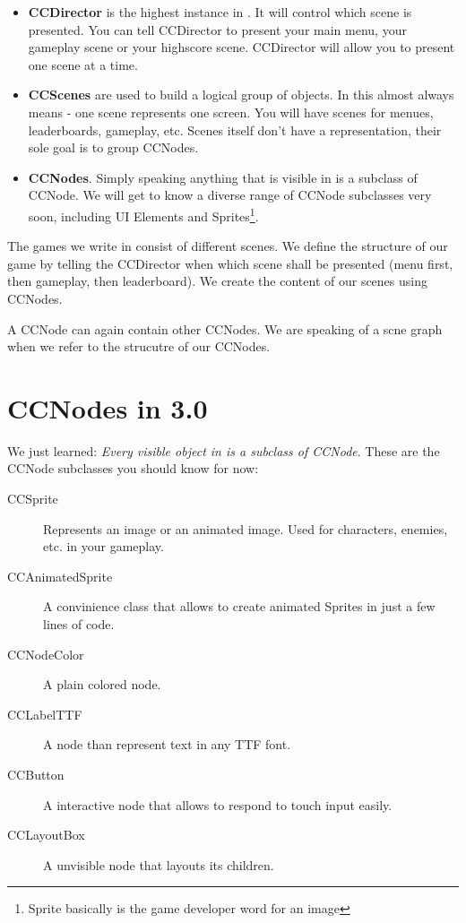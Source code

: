 \begin{itemize}
  \item \textbf{CCDirector} is the highest instance in \cocos{}. It will control
  which scene is presented. You can tell CCDirector to present your main menu,
  your gameplay scene or your highscore scene. CCDirector will allow you to
  present one scene at a time.
  \item \textbf{CCScenes} are used to build a logical group of objects. In
  \cocos{} this almost always means - one scene represents one screen. You will
  have scenes for menues, leaderboards, gameplay, etc. Scenes itself don't have
  a representation, their sole goal is to group CCNodes.
  \item \textbf{CCNodes}. Simply speaking anything that is visible in \cocos{}
  is a subclass of CCNode. We will get to know a diverse range of CCNode
  subclasses very soon, including UI Elements and Sprites\footnote{Sprite
  basically is the game developer word for an image}.
\end{itemize}

The games we write in \cocos{} consist of different scenes. We define the
structure of our game by telling the CCDirector when which scene shall be
presented (menu first, then gameplay, then leaderboard). We create the content
of our scenes using CCNodes.

A CCNode can again contain other CCNodes. We are speaking of a scne graph when
we refer to the strucutre of our CCNodes.

\section{CCNodes in \cocos{} 3.0}
We just learned: \textit{Every visible object in \cocos{} is a subclass of
CCNode}. These are the CCNode subclasses you should know for now:

\begin{description}
  \item[CCSprite] Represents an image or an animated image. Used for characters,
  enemies, etc. in your gameplay.
  \item[CCAnimatedSprite] A convinience class that allows to create animated
  Sprites in just a few lines of code.
  \item[CCNodeColor] A plain colored node.
  \item[CCLabelTTF] A node than represent text in any TTF font.
  \item[CCButton] A interactive node that allows to respond to touch input
  easily.
  \item[CCLayoutBox] A unvisible node that layouts its children.
\end{description}

